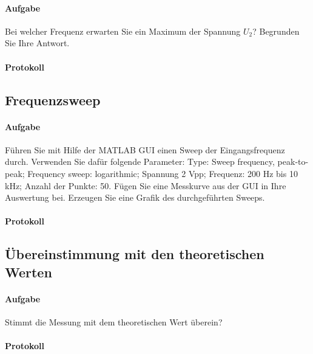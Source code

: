 \documentclass[10pt]{report}
\begin{document}
        \paragraph{Aufgabe}
        Bei welcher Frequenz erwarten Sie ein Maximum der Spannung $U_2$? Begrunden Sie
        Ihre Antwort.

        \paragraph{Protokoll}

        \subsection{Frequenzsweep}
        \paragraph{Aufgabe}
        Führen Sie mit Hilfe der MATLAB GUI einen Sweep der Eingangsfrequenz durch.
        Verwenden Sie dafür folgende Parameter: Type: Sweep frequency, peak-to-peak;
        Frequency sweep: logarithmic; Spannung 2 Vpp; Frequenz: 200 Hz bis 10 kHz; Anzahl
        der Punkte: 50. Fügen Sie eine Messkurve aus der GUI in Ihre Auswertung bei.
        Erzeugen Sie eine Grafik des durchgeführten Sweeps.

        \paragraph{Protokoll}


        \subsection{Übereinstimmung mit den theoretischen Werten}
        \paragraph{Aufgabe}
        Stimmt die Messung mit dem theoretischen Wert überein?

        \paragraph{Protokoll}
\end{document}
